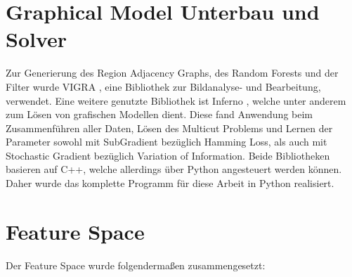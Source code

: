 \section{Graphical Model Unterbau und Solver}


Zur Generierung des Region Adjacency Graphs, des Random Forests und der Filter wurde VIGRA \cite{VIGRA}, eine Bibliothek zur Bildanalyse- und Bearbeitung, verwendet. Eine weitere genutzte Bibliothek ist Inferno \cite{Inferno}, welche unter anderem zum Lösen von grafischen Modellen dient. Diese fand Anwendung beim Zusammenführen aller Daten, Lösen des Multicut Problems und Lernen der Parameter sowohl mit SubGradient bezüglich Hamming Loss, als auch mit Stochastic Gradient bezüglich Variation of Information. Beide Bibliotheken basieren auf C++, welche allerdings über Python angesteuert werden können. Daher wurde das komplette Programm für diese Arbeit in Python realisiert.



\section{Feature Space}\label{sec:exp_featureSpace}

Der Feature Space wurde folgendermaßen zusammengesetzt:

